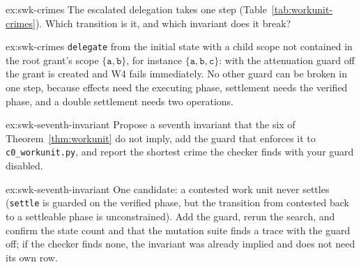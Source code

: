 \documentclass[11pt,a4paper]{article}
\theoremstyle{definition}
\theoremstyle{remark}
\begin{document}

\begin{pdexercise}[kind=Check,rating=1]{ex:swk-crimes}
The escalated delegation takes one step (Table~\ref{tab:workunit-crimes}). Which transition is it, and which invariant does it break?
\end{pdexercise}
\begin{pdsolution}{ex:swk-crimes}
\texttt{delegate} from the initial state with a child scope not contained in the root grant's scope $\{\texttt{a},\texttt{b}\}$, for instance $\{\texttt{a},\texttt{b},\texttt{c}\}$: with the attenuation guard off the grant is created and W4 fails immediately. No other guard can be broken in one step, because effects need the executing phase, settlement needs the verified phase, and a double settlement needs two operations.
\end{pdsolution}
\begin{pdexercise}[kind=Open,rating=3]{ex:swk-seventh-invariant}
Propose a seventh invariant that the six of Theorem~\ref{thm:workunit} do not imply, add the guard that enforces it to \texttt{c0\_workunit.py}, and report the shortest crime the checker finds with your guard disabled.
\end{pdexercise}
\begin{pdsolution}{ex:swk-seventh-invariant}
One candidate: a contested work unit never settles (\texttt{settle} is guarded on the verified phase, but the transition from contested back to a settleable phase is unconstrained). Add the guard, rerun the search, and confirm the state count and that the mutation suite finds a trace with the guard off; if the checker finds none, the invariant was already implied and does not need its own row.
\end{pdsolution}
\end{document}
